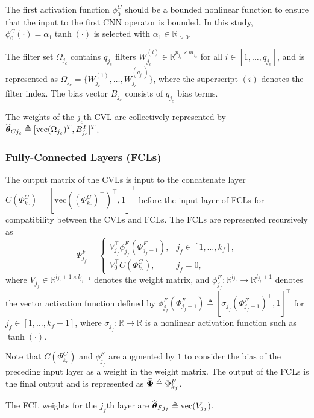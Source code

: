 \documentclass[letterpaper, journal]{IEEEtran}
\newcommand*{\cnnOut}{\Phi^C}
\newcommand*{\cnnAct}{\phi^C}
\newcommand*{\fclOut}{\Phi^F}
\newcommand*{\fclAct}{\phi^F}
\newcommand*{\fclInSpace}{\mathbb{R}^{l_{j_f}}}
\newcommand*{\fclOutSpace}{\mathbb{R}^{l_{j_f}+1}}
\newcommand*{\fclWeightSpace}{\mathbb{R}^{l_{j_f}+1 \times l_{j_f+1}}}
\newcommand{\tH}{\estwth}
\begin{document}
The first activation function $\cnnAct_0$ should be a bounded nonlinear
function to ensure that the input to the first CNN operator is bounded.
In this study, $\cnnAct_0(\cdot)=\alpha_1\tanh(\cdot)$ is selected with
$\alpha_1 \in \mathbb{R}_{>0}$.

The filter set $\Omega_{j_c}$ contains $q_{j_c}$ filters
$W_{j_c}^{(i)} \in \mathbb{R}^{p_{j_c}\times m_{j_c}}$ for all
$i \in [1,\dots,q_{j_c}]$, and is represented as
$\Omega_{j_c}=\{W_{j_c}^{(1)},\dots,W_{j_c}^{(q_{j_c})}\}$, where the
superscript $(i)$ denotes the filter index. The bias vector $B_{j_c}$
consists of $q_{j_c}$ bias terms.

The weights of the $j_c$th CVL are collectively represented by
$\tH_{Cj_c} \triangleq [\mathrm{vec}(\Omega_{j_c})^T, B_{j_c}^T]^T$.


\subsubsection{Fully-Connected Layers (FCLs)} \label{sec:ctrl:arch:fcl}
The output matrix of the CVLs is input to the concatenate layer
$C(\cnnOut_{k_c}) = [\mathrm{vec}((\cnnOut_{k_c})^{\top})^{\top}, 1]^{\top}$
before the input layer of FCLs for compatibility between the CVLs and FCLs.
The FCLs are represented recursively as
\begin{equation} \label{eq:fcl_output}
  \fclOut_{j_f}
  =
  \begin{cases}
    V_{j_f}^{\top}\fclAct_{j_f}(\fclOut_{j_f-1}),
    & j_f \in [1,\dots,k_f], \\
    V_{0}^{\top}C(\cnnOut_{k_c}),
    & j_f = 0
    ,
  \end{cases}
\end{equation}
where $V_{j_f} \in \fclWeightSpace$ denotes the weight matrix, and
$\fclAct_{j_f}:\fclInSpace \to \fclOutSpace$ denotes the vector activation
function defined by $\fclAct_{j_f}(\fclOut_{j_f-1}) \triangleq
[\sigma_{j_f}(\fclOut_{j_f-1})^\top, 1]^\top$
for $j_f \in [1,\dots,k_f-1]$, where
$\sigma_{j_f}:\mathbb{R}\to\mathbb{R}$ is a nonlinear activation function such
as $\tanh(\cdot)$.

Note that $C(\cnnOut_{k_c})$ and $\fclAct_{j_f}$ are augmented by $1$ to
consider the bias of the preceding input layer as a weight in the weight
matrix. The output of the FCLs is the final output and is represented as
$\estNN \triangleq \fclOut_{k_f}$.

The FCL weights for the $j_f$th layer are
$\tH_{Fj_f} \triangleq \mathrm{vec}(V_{j_f})$.
\end{document}
